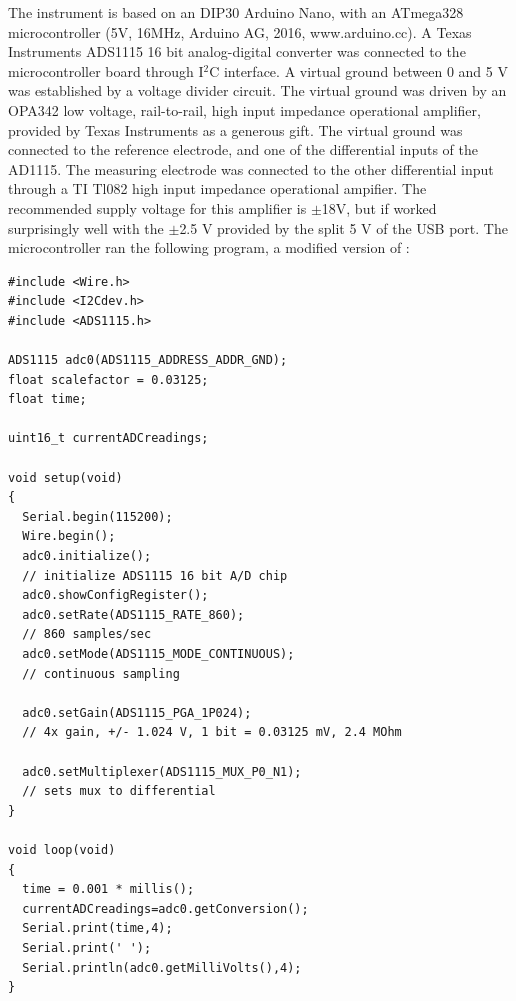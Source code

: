 The instrument is based on an DIP30 Arduino Nano, with an ATmega328 microcontroller (5V, 16MHz, Arduino AG, 2016, www.arduino.cc). A Texas Instruments ADS1115 16 bit analog-digital converter was connected to the microcontroller board through I$^2$C interface. A virtual ground between 0 and 5 V was established by a voltage divider circuit. The virtual ground was driven by an OPA342 low voltage, rail-to-rail, high input impedance operational amplifier, provided by Texas Instruments as a generous gift. The virtual ground was connected to the reference electrode, and one of the differential inputs of the AD1115. The measuring electrode was connected to the other differential input through a TI Tl082 high input impedance operational ampifier. The recommended supply voltage for this amplifier is $\pm$18V, but if worked surprisingly well with the $\pm$2.5 V provided by the split 5 V of the USB port. The microcontroller ran the following program, a modified version of \cite{ads}: 

\begin{lstlisting}
#include <Wire.h>
#include <I2Cdev.h>
#include <ADS1115.h>

ADS1115 adc0(ADS1115_ADDRESS_ADDR_GND); 
float scalefactor = 0.03125;
float time;

uint16_t currentADCreadings;  

void setup(void)
{
  Serial.begin(115200);  
  Wire.begin();
  adc0.initialize();
  // initialize ADS1115 16 bit A/D chip
  adc0.showConfigRegister();
  adc0.setRate(ADS1115_RATE_860);
  // 860 samples/sec
  adc0.setMode(ADS1115_MODE_CONTINUOUS);
  // continuous sampling

  adc0.setGain(ADS1115_PGA_1P024);
  // 4x gain, +/- 1.024 V, 1 bit = 0.03125 mV, 2.4 MOhm
 
  adc0.setMultiplexer(ADS1115_MUX_P0_N1);
  // sets mux to differential
}

void loop(void)
{  
  time = 0.001 * millis();
  currentADCreadings=adc0.getConversion(); 
  Serial.print(time,4);
  Serial.print(' ');
  Serial.println(adc0.getMilliVolts(),4);
} 
\end{lstlisting}


